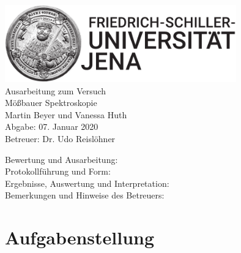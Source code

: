 \documentclass[a4paper,twoside,final]{article}
\begin{document}
\setlength{\marginparsep}{2em}
\renewcommand{\theequation}{\arabic{section}.\arabic{equation}}
\renewcommand{\thefigure}{\arabic{section}.\arabic{figure}}
\renewcommand{\thetable}{\arabic{section}.\arabic{table}}

\begin{center}
\thispagestyle{empty}
  \includegraphics[width=0.75\textwidth]{../UniJena_BildWortMarke_black.pdf}\\[4em]
  \Large
  Ausarbeitung zum Versuch\\[2em]
  \Huge
  Mößbauer Spektroskopie\\
  \vspace{2cm}
  \Large
  Martin Beyer und Vanessa Huth\\[2em]
  Abgabe: 07. Januar 2020\\[2em]
  Betreuer: Dr. Udo Reislöhner\\[5em]
  \begin{flushleft}
  	Bewertung und Ausarbeitung:\\[2em]
		Protokollführung und Form:\\[1em]
		Ergebnisse, Auswertung und Interpretation:\\[1em]
		Bemerkungen und Hinweise des Betreuers:
  \end{flushleft}
\end{center}
\clearpage

\pagestyle{fancy}
\renewcommand{\headrulewidth}{0pt}
\renewcommand{\footrulewidth}{0.5pt}
\renewcommand{\sectionmark}[1]{\markright{#1}}
\fancyhead[RE,LO]{\rightmark}
\fancyfoot[LE,RO]{\bfseries\thepage}
\renewcommand{\headrulewidth}{0.5pt}
\renewcommand{\footrulewidth}{0.5pt}

\setcounter{equation}{0}
\setcounter{figure}{0}

\tableofcontents
{}%
\newpage
{}
\section{Aufgabenstellung} \label{sec:Aufgabenstellung}
\end{document}
